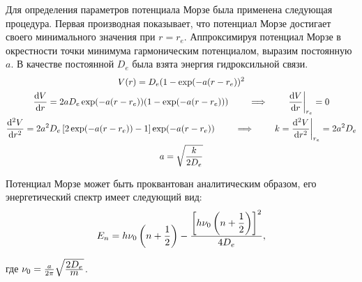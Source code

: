 Для определения параметров потенциала Морзе была применена следующая процедура. Первая производная показывает, что потенциал Морзе достигает своего минимального значения при $r = r_e$. Аппроксимируя потенциал Морзе в окрестности точки минимума гармоническим потенциалом, выразим постоянную $a$. В качестве постоянной $D_e$ была взята энергия гидроксильной связи. 
\vverh
\begin{gather}
V(r) = D_e (1 - \exp (- a (r - r_e))^2 \notag \\
\frac{\mathrm{d}V}{\mathrm{d}r} = 2 a D_e \exp (- a (r - r_e)) (1 - \exp (-a (r - r_e))) 
\qquad \implies \qquad \frac{\mathrm{d}V}{\mathrm{d}r} \bigg{|}_{r_e} = 0 \notag \\
\frac{\mathrm{d}^2 V}{\mathrm{d}r^2} = 2 a^2 D_e \left[ 2 \exp (-a (r - r_e)) - 1 \right] \exp (-a (r - r_e)) \qquad \implies \qquad k = \frac{\mathrm{d}^2 V}{\mathrm{d}r^2} \bigg{|}_{r_e} = 2 a^2 D_e \notag \\
a = \sqrt{\frac{\displaystyle k}{\displaystyle 2D_e}} \notag
\end{gather}

Потенциал Морзе может быть проквантован аналитическим образом, его энергетический спектр имеет следующий вид:
\vverh
\begin{gather}
E_n = h \nu_0 \left( n + \frac{1}{2} \right) - \frac{\displaystyle \left[ h \nu_0 \left( n + \frac{1}{2} \right) \right]^2 }{\displaystyle 4 D_e}, \notag
\end{gather} 

где $\nu_0 = \frac{a}{2 \pi} \sqrt{\frac{\displaystyle 2 D_e}{\displaystyle m}}$.